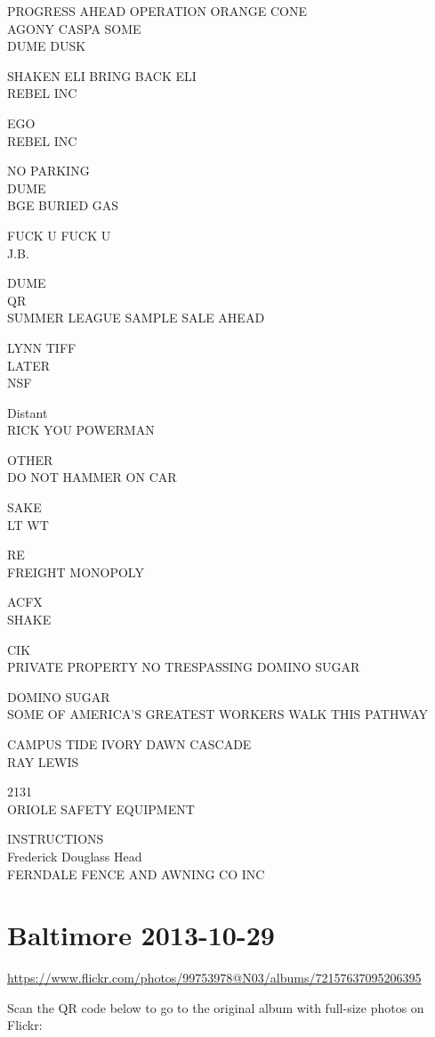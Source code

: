 \documentclass[10pt,letterpaper]{article}
\begin{document}
PROGRESS AHEAD OPERATION ORANGE CONE\\
AGONY CASPA SOME\\
DUME DUSK

SHAKEN ELI BRING BACK ELI\\
REBEL INC

EGO\\
REBEL INC

NO PARKING\\
DUME\\
BGE BURIED GAS

FUCK U FUCK U\\
J.B.

DUME\\
QR\\
SUMMER LEAGUE SAMPLE SALE AHEAD

LYNN TIFF\\
LATER\\
NSF

Distant\\
RICK YOU POWERMAN

OTHER\\
DO NOT HAMMER ON CAR

SAKE\\
LT WT

RE\\
FREIGHT MONOPOLY

ACFX\\
SHAKE

CIK\\
PRIVATE PROPERTY NO TRESPASSING DOMINO SUGAR

DOMINO SUGAR\\
SOME OF AMERICA'S GREATEST WORKERS WALK THIS PATHWAY

CAMPUS TIDE IVORY DAWN CASCADE\\
RAY LEWIS

2131\\
ORIOLE SAFETY EQUIPMENT

INSTRUCTIONS\\
Frederick Douglass Head\\
FERNDALE FENCE AND AWNING CO INC


\section*{Baltimore 2013-10-29}

\url{https://www.flickr.com/photos/99753978@N03/albums/72157637095206395}

Scan the QR code below to go to the original album with full-size photos on Flickr:
\end{document}
